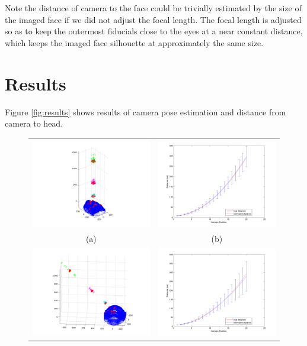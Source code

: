 \documentclass[runningheads]{llncs}
\begin{document}
Note the distance of camera to the face could be trivially estimated by the size of the imaged face if we did not adjust the focal length. 
The focal length is adjusted so as to keep the outermost fiducials close to the eyes at a near constant distance, which keeps the imaged face silhouette at approximately the same size.

\section{Results}
Figure \ref{fig:results} shows results of camera pose estimation and distance from camera to head.  
\begin{figure}[ht]
\begin{tabular}{cc}
\includegraphics[width=.45\linewidth]{resources/figures/cameraloc_frontal.png} &
\includegraphics[width=.45\linewidth]{resources/figures/errorbar_frontal.png} \\
(a) & (b) \\
\includegraphics[width=.45\linewidth]{resources/figures/cameraloc_3q.png} &
\includegraphics[width=.45\linewidth]{resources/figures/errorbar_3q.png} \\

\end{tabular}
\end{figure}
\end{document}
